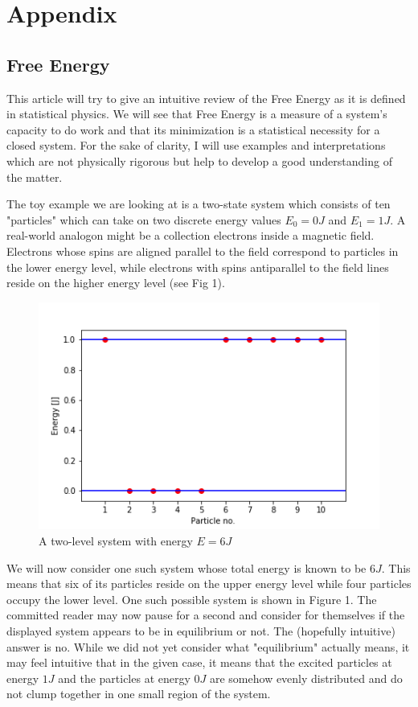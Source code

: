 \chapter{Appendix}

\section{Free Energy}
\label{sec:FE_app}
This article will try to give an intuitive review of the Free Energy as it is defined in statistical physics. We will see that Free Energy is a measure of a system's capacity to do work and that its minimization is a statistical necessity for a closed system. For the sake of clarity, I will use examples and interpretations which are not physically rigorous but help to develop a good understanding of the matter.

The toy example we are looking at is a two-state system which consists of ten "particles" which can take on two discrete energy values $E_0 = 0 J$ and $E_1 = 1 J$. A real-world analogon might be a collection electrons inside a magnetic field. Electrons whose spins are aligned parallel to the field correspond to particles in the lower energy level, while electrons with spins antiparallel to the field lines reside on the higher energy level (see Fig 1).

\begin{figure}
\includegraphics[scale=0.5]{images/FE_ex_1}
\caption{A two-level system with energy $E = 6J$}
\end{figure}

We will now consider one such system whose total energy is known to be $6J$. This means that six of its particles reside on the upper energy level while four particles occupy the lower level. One such possible system is shown in Figure 1. The committed reader may now pause for a second and consider for themselves if the displayed system appears to be in equilibrium or not. The (hopefully intuitive) answer is no. While we did not yet consider what "equilibrium" actually means, it may feel intuitive that in the given case, it means that the excited particles at energy $1J$ and the particles at energy $0J$ are somehow evenly distributed and do not clump together in one small region of the system.

